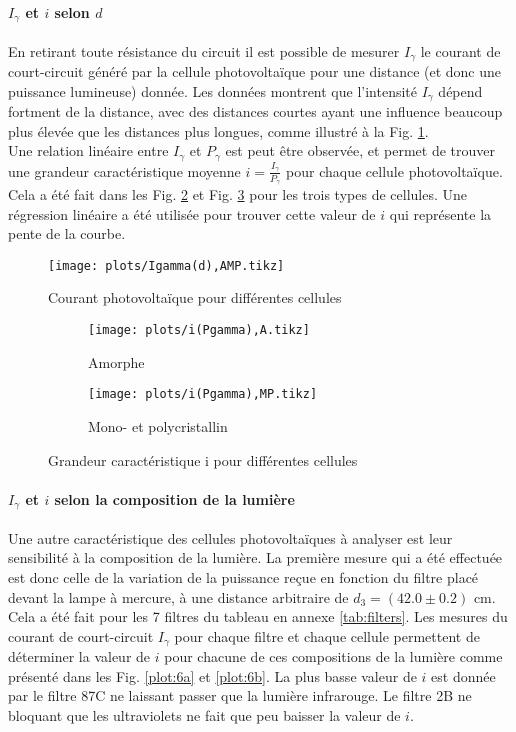 \paragraph*{\(I_\gamma\) et \(i\) selon \(d\)}
En retirant toute résistance du circuit il est possible de mesurer \(I_\gamma\) le courant de court-circuit généré par la cellule photovoltaïque pour une distance (et donc une puissance lumineuse) donnée. Les données montrent que l'intensité \(I_\gamma\) dépend fortment de la distance, avec des distances courtes ayant une influence beaucoup plus élevée que les distances plus longues, comme illustré à la Fig. \ref{plot:4}. \\
Une relation linéaire entre \(I_\gamma\) et \(P_\gamma\) est peut être observée, et permet de trouver une grandeur caractéristique moyenne \(i = \frac{I_\gamma}{P_\gamma}\) pour chaque cellule photovoltaïque. Cela a été fait dans les Fig. \ref{plot:5a} et Fig. \ref{plot:5b} pour les trois types de cellules. Une régression linéaire a été utilisée pour trouver cette valeur de \(i\) qui représente la pente de la courbe.

\begin{figure}
    \centering
    \texttt{[image: plots/Igamma(d),AMP.tikz]}
    \caption{Courant photovoltaïque pour différentes cellules}
    \label{plot:4}
\end{figure}

\begin{figure}
    \centering
    \begin{subfigure}[t]{0.48\linewidth}
        \centering
        \texttt{[image: plots/i(Pgamma),A.tikz]}
        \caption{Amorphe}
        \label{plot:5a}
    \end{subfigure}
    \begin{subfigure}[t]{0.48\linewidth}
        \centering
        \texttt{[image: plots/i(Pgamma),MP.tikz]}
        \caption{Mono- et polycristallin}
        \label{plot:5b}
    \end{subfigure}
    \caption{Grandeur caractéristique i pour différentes cellules}
    \label{plot:5}
\end{figure}

\paragraph*{\(I_\gamma\) et \(i\) selon la composition de la lumière}
Une autre caractéristique des cellules photovoltaïques à analyser est leur sensibilité à la composition de la lumière. La première mesure qui a été effectuée est donc celle de la variation de la puissance reçue en fonction du filtre placé devant la lampe à mercure, à une distance arbitraire de \(d_3 = (42.0 \pm 0.2)\) \unit{\centi\meter}. Cela a été fait pour les 7 filtres du tableau en annexe \ref{tab:filters}. Les mesures du courant de court-circuit \(I_\gamma\) pour chaque filtre et chaque cellule permettent de déterminer la valeur de \(i\) pour chacune de ces compositions de la lumière comme présenté dans les Fig. \ref{plot:6a} et \ref{plot:6b}. La plus basse valeur de \(i\) est donnée par le filtre 87C ne laissant passer que la lumière infrarouge. Le filtre 2B ne bloquant que les ultraviolets ne fait que peu baisser la valeur de \(i\).

